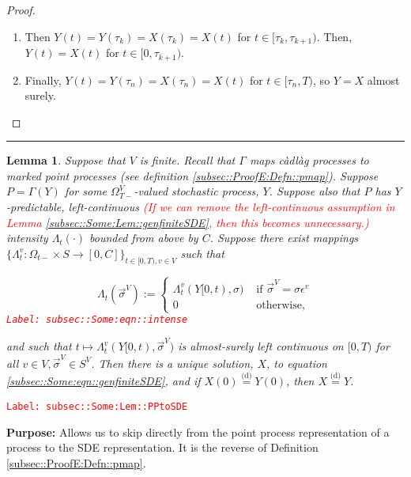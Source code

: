 \documentclass[12pt]{article}
\newcommand{\ra}{\rightarrow}
\newcommand{\te}{\text}
\newcommand{\ep}{\epsilon}
\newcommand{\tr}{\textcolor{red}}
\newcommand{\labe}[1]{\tr{\texttt{Label: #1}}}
\newcommand{\purpose}{\textbf{Purpose: }}
\newcommand{\lin}{\rule{\linewidth}{0.4 pt}}
\newcommand{\deq}{\overset{\text{(d)}}{=}}			%
\renewcommand{\v}{v}							%
\renewcommand{\S}{S}							%
\newcommand{\s}{\sigma}							%
\newcommand{\sv}{\vec{\s}}						%
\newcommand{\ev}{\ep}							%
\newcommand{\T}{T}								%
\renewcommand{\t}{t}							%
\newcommand{\sset}{\Omega}						%
\newcommand{\X}{X}								%
\newcommand{\vind}[1]{^{#1}}					%
\newcommand{\carp}[1]{^{#1}}					%
\newcommand{\vsi}[1]{^{#1}}						%
\newcommand{\tp}[1]{(#1)}						%
\newcommand{\tip}[1]{#1}						%
\newcommand{\ts}[1]{_{#1}}						%
\newcommand{\const}{C}							%
\newcommand{\indx}[1]{_{#1}}					%
\newcommand{\XX}{Y}								%
\newcommand{\rt}{\tau}							%
\renewcommand{\it}{k}							%
\newcommand{\pmap}{\Gamma}						%
\newcommand{\rp}{P}								%
\newcommand{\ratee}{\Lambda}					%
\newtheorem{lem}[thms]{Lemma}
\begin{document}
\begin{proof}
\begin{enumerate}
\item Then \(\XX\tp{\t} = \XX\tp{\rt\indx{\it}} = \X\tp{\rt\indx{\it}} = \X\tp{\t}\) for \(\t \in [\rt\indx{\it},\rt\indx{\it+1})\). Then, \(\XX\tp{\t} = \X\tp{\t}\) for \(\t\in [0,\rt\indx{\it+1})\).

\item Finally, \(\XX\tp{\t} = \XX\tp{\rt\indx{n}} = \X\tp{\rt\indx{n}} = \X\tp{\t}\) for \(\t\in [\rt\indx{n},\T)\), so \(\XX = \X\) almost surely.
\end{enumerate}
\end{proof}

\lin

\begin{lem}
Suppose that \(V\) is finite. Recall that \(\pmap\) maps c\`adl\`ag processes to marked point processes (see definition \ref{subsec::ProofE:Defn::pmap}). Suppose \(\rp = \pmap(\XX)\) for some \(\sset\vsi{V}\ts{\T-}\)-valued stochastic process, \(\XX\). Suppose also that \(\rp\) has \(\XX\)-predictable, left-continuous \tr{(If we can remove the left-continuous assumption in Lemma \ref{subsec::Some:Lem::genfiniteSDE}, then this becomes unnecessary.)} intensity \(\ratee\ts{\t}(\cdot)\) bounded from above by \(\const\). Suppose there exist mappings \(\{\ratee\ts{\t}\vind{\v}:\sset\ts{\t-}\times \S \ra [0,\const]\}_{\t\in[0,\T),\v\in V}\) such that 

\begin{equation}
\ratee\ts{\t}(\sv\vsi{V}) := \begin{cases}
\ratee\ts{\t}\vind{\v}(\XX\tip{[0,\t)},\s) &\te{ if } \sv\vsi{V} = \s\ev\vind{\v}\\
0 &\te{ otherwise,}
\end{cases}
\label{subsec::Some:eqn::intense}
\end{equation}
\labe{subsec::Some:eqn::intense}

and such that \(\t\mapsto \ratee\ts{\t}\vind{\v}(\XX\tip{[0,\t)},\sv\vsi{V})\) is almost-surely left continuous on \([0,\T)\) for all \(\v\in V,\sv\vsi{V}\in \S\carp{V}\). Then there is a unique solution, \(\X\), to equation \eqref{subsec::Some:eqn::genfiniteSDE}, and if \(\X\tp{0} \deq \XX\tp{0}\), then \(\X \deq \XX\).

\label{subsec::Some:Lem::PPtoSDE}
\end{lem}
\labe{subsec::Some:Lem::PPtoSDE}

\purpose Allows us to skip directly from the point process representation of a process to the SDE representation. It is the reverse of Definition \ref{subsec::ProofE:Defn::pmap}.
\end{document}
